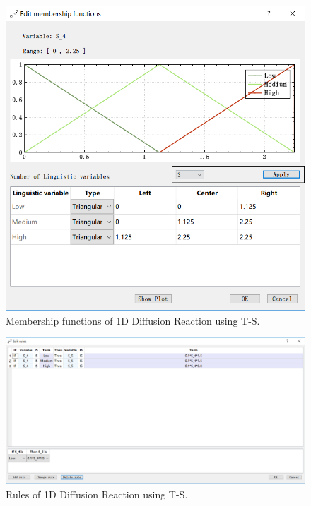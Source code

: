 \documentclass[journal,a4paper,onecolumn]{article}
\begin{document}
\begin{figure}[!hbt]
	\begin{center}
		\includegraphics[width=\columnwidth]{fig34}
		\caption{Membership functions of 1D Diffusion Reaction using T-S.}
		\label{fig:Membership functions of 1D Diffusion Reaction using T-S.}
	\end{center}
\end{figure}
\begin{figure}[!hbt]
	\begin{center}
		\includegraphics[width=\columnwidth]{fig35}
		\caption{Rules of 1D Diffusion Reaction using T-S.}
		\label{fig:Rules of 1D Diffusion Reaction using T-S.}
	\end{center}
\end{figure}
\end{document}
